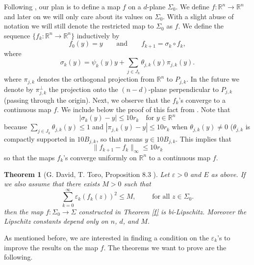 \documentclass[11pt, twoside, leqno]{article}
\numberwithin{equation}{section}
\theoremstyle{plain}
\newtheorem{thm}{Theorem}[section]
\theoremstyle{definition}
\newcommand{\R}{\mathbb{R}}
\newcommand{\e}{\varepsilon} %
\begin{document}
Following \cite{davidtoro}, our plan is to define a map $f$ on a $d$-plane $\Sigma_0$. We define $f \colon \R^n \to \R^n$ and later on we will only care about its values on $\Sigma_0$. With a slight abuse of notation we will still denote the restricted map to $\Sigma_0$ as $f$. We define the sequence $\{f_k \colon \R^n \to \R^n\}$ inductively by
\begin{equation}
f_0(y)=y \qquad \text{and} \qquad f_{k+1}=\sigma_k \circ f_k,
\end{equation}
where
\begin{equation} \label{sigma}
\sigma_k(y)= \psi_k(y)y + \sum_{j \in J_k} \theta_{j,k}(y)\pi_{j,k}(y).
\end{equation}
where $\pi_{j,k}$ denotes the orthogonal projection from $\R^n$ to $P_{j,k}$. In the future we denote by $\pi^{\perp}_{j,k}$ the projection onto the $(n-d)$-plane perpendicular to $P_{j,k}$ (passing through the origin). 
Next, we observe that the $f_k$'s converge to a continuous map $f$. We include below the proof of this fact from \cite{davidtoro}.
Note that 
\begin{equation}
|\sigma_k(y)-y| \leq 10r_k \quad \text{for $y \in \R^n$}
\end{equation}
because $\sum_{j \in J_k}\theta_{j,k}(y) \leq 1$ and $|\pi_{j,k}(y)-y| \leq 10r_k$ when $\theta_{j,k}(y)\neq 0$ ($\theta_{j,k}$ is compactly supported in $10B_{j,k}$, so that means $y \in 10B_{j,k}$. This implies that
\begin{equation}
    \|f_{k+1}-f_k\|_{\infty} \leq 10r_k
\end{equation}
so that the maps $f_k$'s converge uniformly on $\R^n$ to a continuous map $f$.

\begin{thm} [G. David, T. Toro,  Proposition 8.3 \cite{davidtoro}] \label{ftdt}
Let $\e >0$ and $E$ as above. If we also assume that there exists $M >0$ such that
\begin{equation}
\sum_{k=0}^{\infty}  \e_k(f_k(z))^2 \leq M, \qquad \text{ for all $z \in \Sigma_0$}.
\end{equation}
then the map $f \colon \Sigma_0 \to \Sigma$ constructed in Theorem \ref{f} is bi-Lipschitz. Moreover the Lipschitz constants depend only on $n$, $d$, and $M$.
\end{thm}

As mentioned before, we are interested in finding a condition on the $ \e_k$'s to improve the results on the map $f$. The theorems we want to prove are the following.
\end{document}

